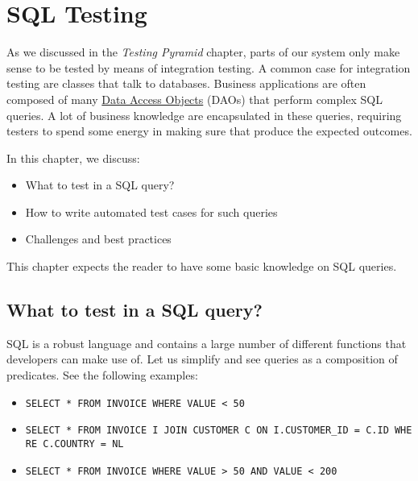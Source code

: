 \hypertarget{sql-testing}{%
\section{SQL Testing}\label{sql-testing}}

As we discussed in the \emph{Testing Pyramid} chapter, parts of our
system only make sense to be tested by means of integration testing. A
common case for integration testing are classes that talk to databases.
Business applications are often composed of many
\href{https://en.wikipedia.org/wiki/Data_access_object}{Data Access
Objects} (DAOs) that perform complex SQL queries. A lot of business
knowledge are encapsulated in these queries, requiring testers to spend
some energy in making sure that produce the expected outcomes.

In this chapter, we discuss:

\begin{itemize}
\tightlist
\item
  What to test in a SQL query?
\item
  How to write automated test cases for such queries
\item
  Challenges and best practices
\end{itemize}

This chapter expects the reader to have some basic knowledge on SQL
queries.

\hypertarget{what-to-test-in-a-sql-query}{%
\subsection{What to test in a SQL
query?}\label{what-to-test-in-a-sql-query}}

SQL is a robust language and contains a large number of different
functions that developers can make use of. Let us simplify and see
queries as a composition of predicates. See the following examples:

\begin{itemize}
\tightlist
\item
  \texttt{SELECT\ *\ FROM\ INVOICE\ WHERE\ VALUE\ \textless{}\ 50}
\item
  \texttt{SELECT\ *\ FROM\ INVOICE\ I\ JOIN\ CUSTOMER\ C\ ON\ I.CUSTOMER\_ID\ =\ C.ID\ WHERE\ C.COUNTRY\ =\ \textquotesingle{}NL\textquotesingle{}}
\item
  \texttt{SELECT\ *\ FROM\ INVOICE\ WHERE\ VALUE\ \textgreater{}\ 50\ AND\ VALUE\ \textless{}\ 200}
\end{itemize}

